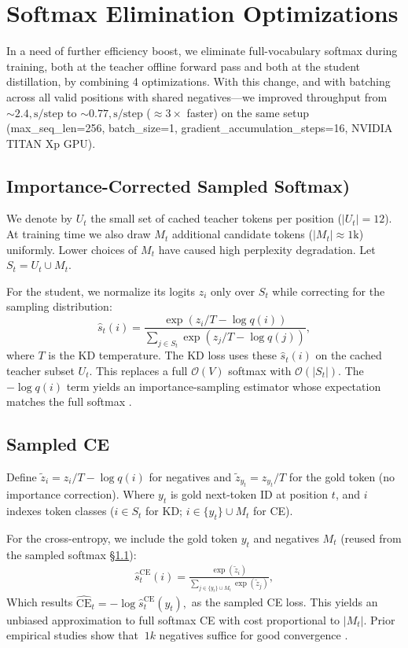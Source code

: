 \documentclass[11pt]{article}
\begin{document}
\section{Softmax Elimination Optimizations}
\label{sec:softmax_elimination}
In a need of further efficiency boost, we eliminate full-vocabulary softmax during training, both at the teacher offline forward pass and both at the student distillation, by combining 4 optimizations.
With this change, and with batching across all valid positions with shared negatives---we improved throughput from $\sim2.4,\text{s/step}$ to $\sim0.77,\text{s/step}$ ($\approx 3\times$ faster) on the same setup (max\_seq\_len=256, batch\_size=1, gradient\_accumulation\_steps=16, NVIDIA TITAN Xp GPU).

\subsection{Importance-Corrected Sampled Softmax)}
\label{sec:sampled_softmax}
We denote by $U_t$ the small set of cached teacher tokens per position ($|U_t|=12$).
At training time we also draw $M_t$ additional candidate tokens ($|M_t| \approx 1\text{k}$) uniformly.
Lower choices of $M_t$ have caused high perplexity degradation.
Let $S_t = U_t \cup M_t$.

For the student, we normalize its logits $z_i$ only over $S_t$ while correcting for the sampling distribution:
\[
	\hat s_t(i) = \frac{\exp(z_i/T - \log q(i))}{\sum_{j \in S_t} \exp(z_j/T - \log q(j))},
\]
where $T$ is the KD temperature.
The KD loss uses these $\hat s_t(i)$ on the cached teacher subset $U_t$. This replaces a full $\mathcal{O}(V)$ softmax with $\mathcal{O}(|S_t|)$.
The $-\log q(i)$ term yields an importance-sampling estimator whose expectation matches the full softmax \citep{jean2015large}.

\subsection{Sampled CE}
Define $\tilde z_i = z_i/T - \log q(i)$ for negatives and $\tilde z_{y_t}=z_{y_t}/T$ for the gold token (no importance correction).
Where $y_t$ is gold next-token ID at position $t$, and $i$ indexes token classes ($i\in S_t$ for KD; $i\in\{y_t\}\cup M_t$ for CE).

For the cross-entropy, we include the gold token $y_t$ and negatives $M_t$ (reused from the sampled softmax \S\ref{sec:sampled_softmax}):
\begin{align*}
	\hat s^{\text{CE}}_t(i) = \frac{\exp(\tilde z_i)}{\sum_{j \in \{y_t\}\cup M_t} \exp(\tilde z_j)},
\end{align*}
Which results
\(
\widehat{\text{CE}}_t = -\log \hat s^{\text{CE}}_t(y_t),
\)
as the sampled CE loss.
This yields an unbiased approximation to full softmax CE with cost proportional to $|M_t|$.
Prior empirical studies show that $~1k$ negatives suffice for good convergence \citep{blanc2018adaptive}.
\end{document}
